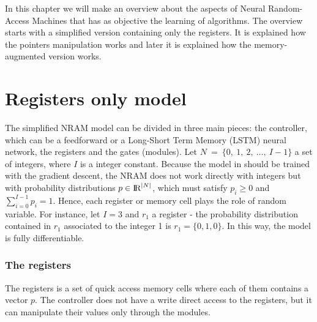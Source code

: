 \label{chap:nram}
In this chapter we will make an overview about the aspects of Neural Random-Access Machines \cite{NRAM:2016} that has as objective the learning of algorithms. The overview starts with a simplified version containing only the registers. It is explained how the pointers manipulation works and later it is explained how the memory-augmented version works.

\section{Registers only model}
The simplified NRAM model can be divided in three main pieces: the controller, which can be a feedforward or a Long-Short Term Memory (LSTM) neural network, the registers and the gates (modules). \newline \newline 
Let $N\ =\ \{0,\ 1,\ 2,\ \dots,\ I - 1\}$ a set of integers, where $I$ is a integer constant. Because the model in \cite{NRAM:2016} should be trained with the gradient descent, the NRAM does not work directly with integers but with probability distributions $p \in \textrm{I\!R}^{|N|}$, which must satisfy $p_{i} \geq 0$ and $\sum\limits_{i = 0}^{I-1} p_{i} = 1$. Hence, each register or memory cell plays the role of random variable. For instance, let $I = 3$ and $r_1$ a register - the probability distribution contained in $r_1$ associated to the integer 1 is $r_1 = \{0, 1, 0\}$. In this way, the model is fully differentiable.

\subsubsection*{The registers}
The registers is a set of quick access memory cells where each of them contains a vector $p$. The controller does not have a write direct access to the registers, but it can manipulate their values only through the modules.

